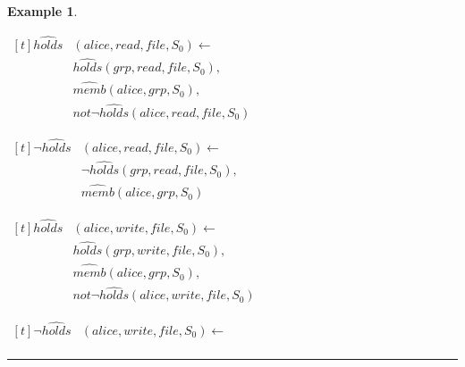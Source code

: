 \documentclass[10pt, twocolumn]{article}
\newtheorem{examp}{Example}
\newenvironment{example}{\begin{examp}\rm}{\rule{2mm}{2mm}\end{examp}}
\begin{document}
\begin{example}
 
          \begin{list}{}{Inheritance Rules}
            \item
              \begin{math}
                  \begin{aligned}[t]
                    \hat{holds}&(alice, read, file, S_{0}) \leftarrow \\
                    & \hat{holds}(grp, read, file, S_{0}), \\
                    & \hat{memb}(alice, grp, S_{0}), \\
                    & not \lnot \hat{holds}(alice, read, file, S_{0})
                  \end{aligned}
              \end{math}
            \item  
              \begin{math}
                  \begin{aligned}[t]
                    \lnot \hat{holds}&(alice, read, file, S_{0}) \leftarrow \\
                    & \lnot \hat{holds}(grp, read, file, S_{0}), \\
                    & \hat{memb}(alice, grp, S_{0})
                  \end{aligned}
              \end{math}
            \item  
              \begin{math}
                  \begin{aligned}[t]
                    \hat{holds}&(alice, write, file, S_{0}) \leftarrow \\
                    & \hat{holds}(grp, write, file, S_{0}), \\
                    & \hat{memb}(alice, grp, S_{0}), \\
                    & not \lnot \hat{holds}(alice, write, file, S_{0})
                  \end{aligned}
              \end{math}
            \item
              \begin{math}
                  \begin{aligned}[t]
                    \lnot \hat{holds}&(alice, write, file, S_{0}) \leftarrow \\

\end{aligned}
\end{math}
\end{list}
\end{example}
\end{document}
